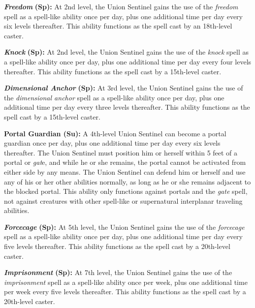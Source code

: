 \documentclass{article}
\begin{document}
\textit{\textbf{Freedom }}\textbf{(Sp):} At 2nd level, the Union Sentinel gains 
the use of the \textit{freedom }spell as a spell-like ability once per day, plus 
one additional time per day every six levels thereafter. This ability functions 
as the spell cast by an 18th-level caster. 

\textit{\textbf{Knock }}\textbf{(Sp):} At 2nd level, the Union Sentinel gains the 
use of the \textit{knock }spell as a spell-like ability once per day, plus one 
additional time per day every four levels thereafter. This ability functions as 
the spell cast by a 15th-level caster. 

\textit{\textbf{Dimensional Anchor }}\textbf{(Sp):} At 3rd level, the Union Sentinel 
gains the use of the \textit{dimensional anchor }spell as a spell-like ability 
once per day, plus one additional time per day every three levels thereafter. This 
ability functions as the spell cast by a 15th-level caster. 

\textbf{Portal Guardian (Su):} A 4th-level Union Sentinel can become a portal guardian 
once per day, plus one additional time per day every six levels thereafter. The 
Union Sentinel must position him or herself within 5 feet of a portal or \textit{gat}e, 
and while he or she remains, the portal cannot be activated from either side by 
any means. The Union Sentinel can defend him or herself and use any of his or her 
other abilities normally, as long as he or she remains adjacent to the blocked 
portal. This ability only functions against portals and the \textit{gate }spell, 
not against creatures with other spell-like or supernatural interplanar traveling 
abilities. 

\textit{\textbf{Forcecage }}\textbf{(Sp):} At 5th level, the Union Sentinel gains 
the use of the \textit{forcecage }spell as a spell-like ability once per day, plus 
one additional time per day every five levels thereafter. This ability functions 
as the spell cast by a 20th-level caster. 

\textit{\textbf{Imprisonment }}\textbf{(Sp):} At 7th level, the Union Sentinel 
gains the use of the \textit{imprisonment }spell as a spell-like ability once per 
week, plus one additional time per week every five levels thereafter. This ability 
functions as the spell cast by a 20th-level caster. 

\newpage
\end{document}
